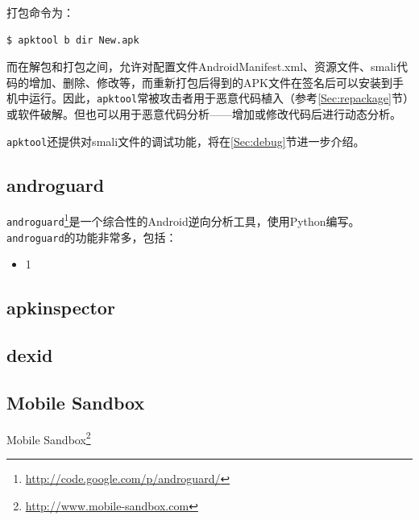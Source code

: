 打包命令为：
\begin{lstlisting}[language=bash, numbers=none]
 $ apktool b dir New.apk
\end{lstlisting}

而在解包和打包之间，允许对配置文件AndroidManifest.xml、资源文件、smali代码的增加、删除、修改等，而重新打包后得到的APK文件在签名后可以安装到手机中运行。因此，\lstinline!apktool!常被攻击者用于恶意代码植入（参考\ref{Sec:repackage}节）或软件破解。但也可以用于恶意代码分析——增加或修改代码后进行动态分析。

\lstinline!apktool!还提供对smali文件的调试功能，将在\ref{Sec:debug}节进一步介绍。

\subsection{androguard}
\lstinline!androguard!\footnote{\url{http://code.google.com/p/androguard/}}是一个综合性的Android逆向分析工具，使用Python编写。\lstinline!androguard!的功能非常多，包括：
\begin{itemize}
  \item 1
\end{itemize}

\subsection{apkinspector}

\subsection{dexid}
\subsection{Mobile Sandbox}
Mobile Sandbox\footnote{\url{http://www.mobile-sandbox.com}}

